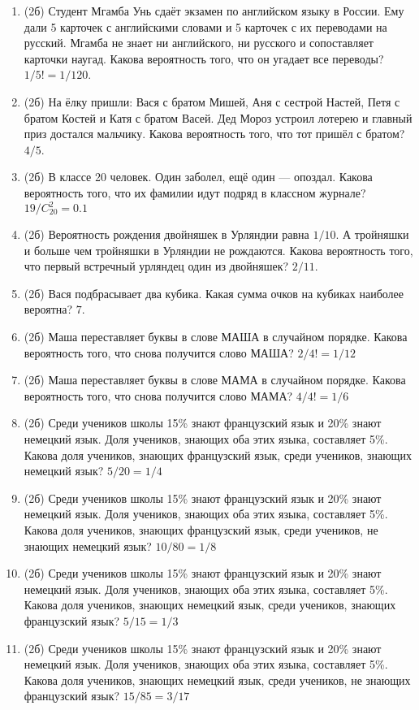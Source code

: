 \documentclass[a4paper, 12pt]{article}
\begin{document}
\newpage
\begin{enumerate}
  \item (2б) Студент Мгамба Унь сдаёт экзамен по английском языку в России. Ему дали 5 карточек с английскими словами и 5 карточек с их переводами на русский. Мгамба не знает ни английского, ни русского и сопоставляет карточки наугад. Какова вероятность того, что он угадает все переводы? $1/5!=1/120$.
  \item (2б) На ёлку пришли: Вася с братом Мишей, Аня с сестрой Настей, Петя с братом Костей и Катя с братом Васей. Дед Мороз устроил лотерею и главный приз достался мальчику. Какова вероятность того, что тот пришёл с братом? $4/5$.
  \item (2б) В классе 20 человек. Один заболел, ещё один — опоздал. Какова вероятность того, что их фамилии идут подряд в классном журнале? $19/C_{20}^2=0.1$
  \item (2б) Вероятность рождения двойняшек в Урляндии равна $1/10$. А тройняшки и больше чем тройняшки в Урляндии не рождаются. Какова вероятность того, что первый встречный урляндец один из двойняшек? $2/11$.
  \item (2б) Вася подбрасывает два кубика. Какая сумма очков на кубиках наиболее вероятна? $7$.
  \item (2б) Маша переставляет буквы в слове МАША в случайном порядке. Какова вероятность того, что снова получится слово МАША? $2/4!=1/12$
  \item (2б) Маша переставляет буквы в слове МАМА в случайном порядке. Какова вероятность того, что снова получится слово МАМА? $4/4!=1/6$
  \item (2б) Среди учеников школы 15\% знают французский язык и 20\% знают немецкий язык. Доля учеников, знающих оба этих языка, составляет 5\%. Какова доля учеников, знающих французский язык, среди учеников, знающих немецкий язык? $5/20=1/4$
  \item (2б) Среди учеников школы 15\% знают французский язык и 20\% знают немецкий язык. Доля учеников, знающих оба этих языка, составляет 5\%. Какова доля учеников, знающих французский язык, среди учеников, не знающих немецкий язык? $10/80=1/8$
  \item (2б) Среди учеников школы 15\% знают французский язык и 20\% знают немецкий язык. Доля учеников, знающих оба этих языка, составляет 5\%. Какова доля учеников, знающих немецкий язык, среди учеников, знающих французский язык? $5/15=1/3$
  \item (2б) Среди учеников школы 15\% знают французский язык и 20\% знают немецкий язык. Доля учеников, знающих оба этих языка, составляет 5\%. Какова доля учеников, знающих немецкий язык, среди учеников, не знающих французский язык? $15/85=3/17$

\end{enumerate}
\end{document}
